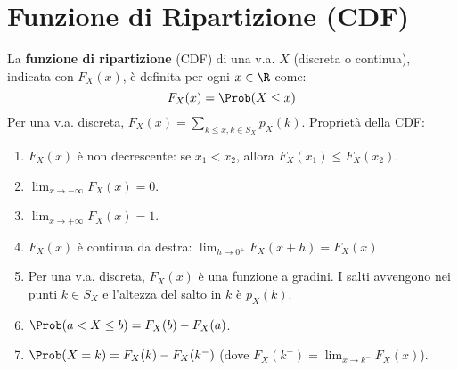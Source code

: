 \section{Funzione di Ripartizione (CDF)}
\begin{definition}
La \textbf{funzione di ripartizione} (CDF) di una v.a. $X$ (discreta o continua), indicata con $F_X(x)$, è definita per ogni $x \in \R$ come:
\[ F_X(x) = \Prob(X \le x) \]
Per una v.a. discreta, $F_X(x) = \sum_{k \le x, k \in S_X} p_X(k)$.
Proprietà della CDF:
\begin{enumerate}
    \item $F_X(x)$ è non decrescente: se $x_1 < x_2$, allora $F_X(x_1) \le F_X(x_2)$.
    \item $\lim_{x \to -\infty} F_X(x) = 0$.
    \item $\lim_{x \to +\infty} F_X(x) = 1$.
    \item $F_X(x)$ è continua da destra: $\lim_{h \to 0^+} F_X(x+h) = F_X(x)$.
    \item Per una v.a. discreta, $F_X(x)$ è una funzione a gradini. I salti avvengono nei punti $k \in S_X$ e l'altezza del salto in $k$ è $p_X(k)$.
    \item $\Prob(a < X \le b) = F_X(b) - F_X(a)$.
    \item $\Prob(X=k) = F_X(k) - F_X(k^-)$ (dove $F_X(k^-) = \lim_{x \to k^-} F_X(x)$).
\end{enumerate}
\end{definition}

